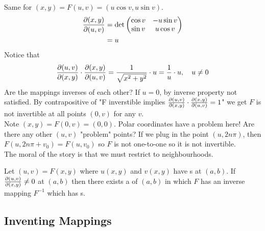 \documentclass[english, 11pt]{article}
\begin{document}
\begin{exmp}
  Same for $(x,y) = F(u,v) = (u\cos v, u\sin v)$.
  \begin{align*}
    \frac{\partial(x,y)}{\partial(u,v)} & = \det \left( \begin{matrix} \cos v & -u\sin v \\ \sin v & u\cos v \end{matrix} \right) \\
    & = u
  \end{align*}
  Notice that
  \[ \frac{\partial(u,v)}{\partial(x,y)} \cdot \frac{\partial(x,y)}{\partial(u,v)} = \frac{1}{\sqrt{x^2 + y^2}}\cdot u = \frac{1}{u} \cdot u, \ \ \ u \not = 0 \]
  Are the mappings inverses of each other? If $u = 0$, by inverse property not satisfied. By contrapositive of "F inverstible implies $\frac{\partial(u,v)}{\partial(x,y)} \cdot \frac{\partial(x,y)}{\partial(u,v)} = 1$" we get $F$ is not invertible at all points $(0, v)$ for any $v$. \\

  Note $(x,y) = F(0,v) = (0,0)$. Polar coordinates have a problem here! Are there any other $(u,v)$ "problem" points? If we plug in the point $(u, 2n \pi)$, then $F(u, 2n\pi + v_0) = F(u,v_0)$ so $F$ is not one-to-one so it is not invertible. \\

  The moral of the story is that we must restrict to neighbourhoods.
\end{exmp}

\begin{thrm}\label{inversemapping}
Let $(u,v) = F(x,y)$ where $u(x,y)$ and $v(x,y)$ have  s at $(a,b)$. If $\frac{\partial(u,v)}{\partial(x,y)} \not = 0$ at $(a,b)$ then there exists a  of $(a,b)$ in which $F$ has an inverse mapping  $F^{-1}$ which has  s.
\end{thrm}

\subsection{Inventing Mappings}
\end{document}
